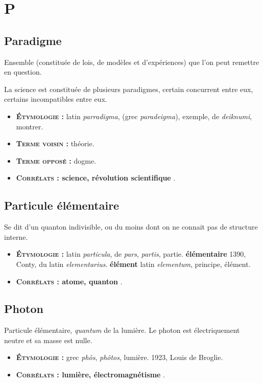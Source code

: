 \chapter{P}
\section{Paradigme}
Ensemble (constituée de lois, de modèles et d'expériences) que l'on peut remettre en question.

La science est constituée de plusieurs paradigmes, certain concurrent entre eux, certains incompatibles entre eux.

{\footnotesize
\begin{itemize}[leftmargin=1cm, label=, itemsep=1pt]
\item {\bf \textsc{Étymologie} :} latin {\it parradigma}, (grec {\it paradeigma}), exemple,
de {\it deiknumi}, montrer.
\item {\bf \textsc{Terme voisin} :} théorie.
\item {\bf \textsc{Terme opposé} :} dogme.
\item {\bf \textsc{Corrélats} : science, révolution scientifique} .
\end{itemize}
}

\section{Particule élémentaire}
Se dit d'un quanton indivisible, ou du moins dont on ne connait pas de structure interne.
{\footnotesize
\begin{itemize}[leftmargin=1cm, label=, itemsep=1pt]
\item {\bf \textsc{Étymologie} :} latin {\it particula}, de {\it pars}, {\it partis}, partie.
{\bf élémentaire} 1390, Conty, du latin {\it elementarius}.
{\bf élément} latin {\it elementum}, principe, élément.
\item {\bf \textsc{Corrélats} : atome, quanton} .
\end{itemize}
}

\section{Photon}
Particule élémentaire, {\it quantum} de la lumière.
Le photon est électriquement neutre et sa masse est nulle.
{\footnotesize
\begin{itemize}[leftmargin=1cm, label=, itemsep=1pt]
\item {\bf \textsc{Étymologie} :} grec {\it phôs}, {\it phôtos}, lumière. 1923, Louis de Broglie.
\item {\bf \textsc{Corrélats} : lumière, électromagnétisme} .
\end{itemize}
}

